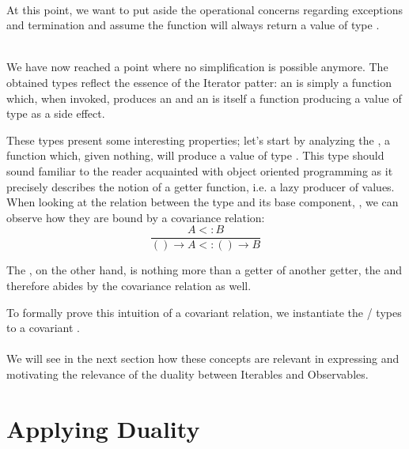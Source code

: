 \\

At this point, we want to put aside the operational concerns regarding exceptions and termination and assume the  function will always return a value of type .

\\

We have now reached a point where no simplification is possible anymore. The obtained types reflect the essence of the Iterator patter: an  is simply a function which, when invoked, produces an  and an  is itself a function producing a value of type  as a side effect. 

These types present some interesting properties; let's start by analyzing the , a function which, given nothing, will produce a value of type . This type should sound familiar to the reader acquainted with object oriented programming as it precisely describes the notion of a getter function, i.e. a lazy producer of values. When looking at the relation between the  type and its base component, , we can observe how they are bound by a covariance relation:
\begin{displaymath}
\frac{A <: B}{() \rightarrow A <: () \rightarrow B} 
\end{displaymath}

The , on the other hand, is nothing more than a getter of another getter, the  and therefore abides by the covariance relation as well.

To formally prove this intuition of a covariant relation, we instantiate the / types to a covariant .\\

\\

We will see in the next section how these concepts are relevant in expressing and motivating the relevance of the duality between Iterables and Observables.

\section{Applying Duality}
\label{sec:applyingduality}

